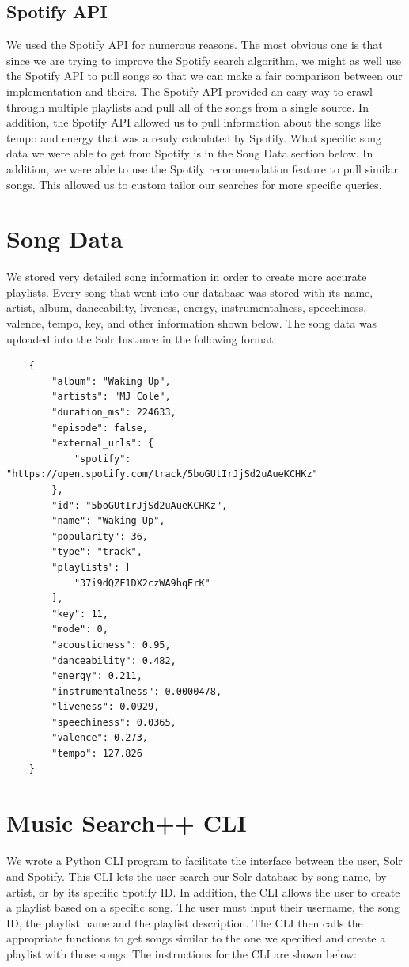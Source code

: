 \documentclass [letter,12pt] {article}
\begin{document}
    \subsection{Spotify API}
        We used the Spotify API for numerous reasons. The most obvious one is that since we are trying to improve the Spotify search algorithm, we might as well use the Spotify API to pull songs so that we can make a fair comparison between our implementation and theirs. The Spotify API provided an easy way to crawl through multiple playlists and pull all of the songs from a single source. In addition, the Spotify API allowed us to pull information about the songs like tempo and energy that was already calculated by Spotify. What specific song data we were able to get from Spotify is in the Song Data section below. In addition, we were able to use the Spotify recommendation feature to pull similar songs. This allowed us to custom tailor our searches for more specific queries. 
        


        
\section{Song Data}
    We stored very detailed song information in order to create more accurate playlists. Every song that went into our database was stored with its name, artist, album, danceability, liveness, energy, instrumentalness, speechiness, valence, tempo, key, and other information shown below. The song data was uploaded into the Solr Instance in the following format:
    
    \begin{verbatim}
    {
        "album": "Waking Up",
        "artists": "MJ Cole",
        "duration_ms": 224633,
        "episode": false,
        "external_urls": {
            "spotify": "https://open.spotify.com/track/5boGUtIrJjSd2uAueKCHKz"
        },
        "id": "5boGUtIrJjSd2uAueKCHKz",
        "name": "Waking Up",
        "popularity": 36,
        "type": "track",
        "playlists": [
            "37i9dQZF1DX2czWA9hqErK"
        ],
        "key": 11,
        "mode": 0,
        "acousticness": 0.95,
        "danceability": 0.482,
        "energy": 0.211,
        "instrumentalness": 0.0000478,
        "liveness": 0.0929,
        "speechiness": 0.0365,
        "valence": 0.273,
        "tempo": 127.826
    }
    \end{verbatim}
    
\section{Music Search++ CLI}
    We wrote a Python CLI program to facilitate the interface between the user, Solr and Spotify. This CLI lets the user search our Solr database by song name, by artist, or by its specific Spotify ID. In addition, the CLI allows the user to create a playlist based on a specific song. The user must input their username, the song ID, the playlist name and the playlist description. The CLI then calls the appropriate functions to get songs similar to the one we specified and create a playlist with those songs. The instructions for the CLI are shown below:
    
\end{document}
